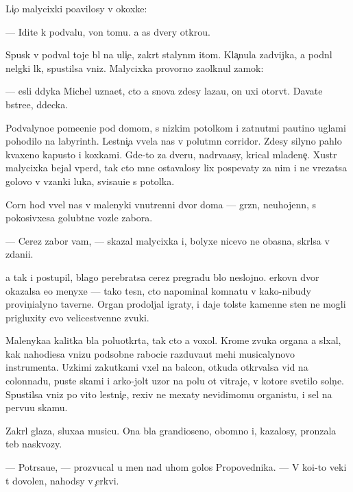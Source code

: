 \documentclass[10pt]{book}
\begin{document}
Li{\c}o malycixki po{\y}avilosy v okoxke:

— Idite k podvalu, von tomu. {\Y}a {\x}as dvery otkro{\y}u.

Spusk v podval toje b{\yi}l na uli{\c}e, zakr{\yi}t{\yi}{\y} stalyn{\yi}m {\x}itom. Kla{\c}nula zadvijka, {\y}a podn{\ia}l nel{\e}gki{\y} l{\io}k, spustilsa vniz. Malycixka provorno za{\x}olknul zamok:

— {\Y}esli d{\ia}dyka Michel uzna{\y}et, cto {\y}a snova zdesy laza{\y}u, on uxi otorv{\e}t. Dava{\y}te b{\yi}stre{\y}e, d{\ia}decka.

Podvalyno{\y}e pome{\x}eni{\y}e pod domom, s nizkim potolkom i zat{\ia}nut{\yi}mi pautino{\y} uglami pohodilo na labyrinth. Lestni{\c}a v{\yi}vela nas v polut{\e}mn{\yi}{\y} corridor. Zdesy silyno pahlo kvaxeno{\y} kapusto{\y} i koxkami. Gde-to za dver{\y}u, nadr{\yi}va{\y}asy, krical mladene{\c}. Xustr{\yi}{\y} malycixka bejal vper{\e}d, tak cto mne ostavalosy lix pospevaty za nim i ne vrezatsa golovo{\y} v v{\ia}zanki luka, svisa{\y}u{\x}i{\y}e s potolka.

Corn{\yi}{\y} hod v{\yi}vel nas v malenyki{\y} vnutrenni{\y} dvor doma — gr{\ia}zn{\yi}{\y}, neuhojenn{\yi}{\y}, s pokosivxe{\y}sa golub{\ia}tne{\y} vozle zabora.

— Cerez zabor vam, — skazal malycixka i, bolyxe nicevo ne ob{\y}asn{\ia}{\y}a, skr{\yi}lsa v zdani{\y}i.

{\Y}a tak i postupil, blago perebratsa cerez pregradu b{\yi}lo neslojno. {\C}erkovn{\yi}{\y} dvor okazalsa {\y}e{\x}o menyxe — tako{\y} tesn{\yi}{\y}, cto napominal komnatu v kako{\y}-nibudy provin{\c}ialyno{\y} taverne. Organ prodoljal igraty, i daje tolst{\yi}{\y}e kamenn{\yi}{\y}e sten{\yi} ne mogli prigluxity {\y}evo velicestvenn{\yi}{\y}e zvuki.

Malenyka{\y}a kalitka b{\yi}la poluotkr{\yi}ta, tak cto {\y}a voxol. Krome zvuka organa {\y}a sl{\yi}xal, kak nahod{\ia}{\x}i{\y}esa vnizu podsobn{\yi}{\y}e raboci{\y}e razduva{\y}ut mehi musicalynovo instrumenta. Uzkimi zakutkami v{\yi}xel na balcon, otkuda otkr{\yi}valsa vid na colonnadu, pust{\yi}{\y}e skam{\yf}i i {\y}arko-jolt{\yi}{\y} uzor na polu ot vitraje{\y}, v kotor{\yi}{\y}e svetilo soln{\c}e. Spustilsa vniz po vito{\y} lestni{\c}e, rexiv ne mexaty nevidimomu organistu, i sel na pervu{\y}u skam{\y}u.

Zakr{\yi}l glaza, sluxa{\y}a musicu. Ona b{\yi}la grandioseno{\y}, ob{\y}omno{\y} i, kazalosy, pronzala teb{\ia} naskvozy.

— Potr{\ia}sa{\y}u{\x}e, — prozvucal u men{\ia} nad uhom golos Propovednika. — V ko{\y}i-to veki t{\yi} dovolen, nahod{\ia}sy v {\c}erkvi.
\end{document}
